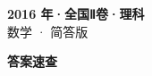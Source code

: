 \documentclass[zihao=-4, a4paper]{ctexart}
\begin{document}
\begin{center}
  {\Large\bfseries 2016 年·全国Ⅱ卷·理科}\\[4pt]
  {\large 数学 · 简答版}
\end{center}
\medskip
{}

\clearpage
{}
\begin{center}{\Large\bfseries 答案速查}\end{center}
\medskip

\end{document}
